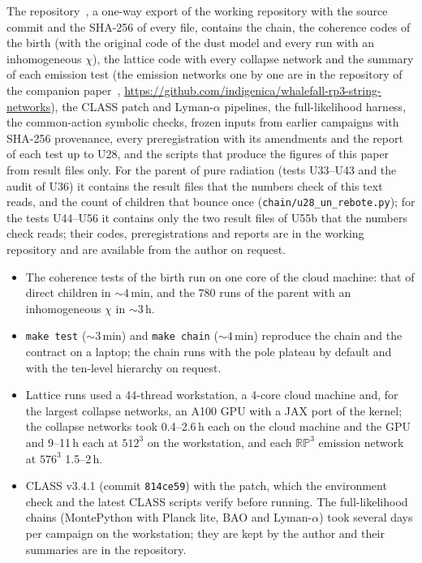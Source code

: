 \documentclass[11pt,a4paper]{article}
\newcommand{\RP}{\mathbb{RP}^3}
\begin{document}
The repository~\cite{whalefall_chain}, a one-way export of the working repository with the source commit and the SHA-256 of every file, contains the chain, the coherence codes of the birth (with the original code of the dust model and every run with an inhomogeneous $\chi$), the lattice code with every collapse network and the summary of each emission test (the emission networks one by one are in the repository of the companion paper~\cite{rp3_paper}, \url{https://github.com/indigenica/whalefall-rp3-string-networks}), the CLASS patch and Lyman-$\alpha$ pipelines, the full-likelihood harness, the common-action symbolic checks, frozen inputs from earlier campaigns with SHA-256 provenance, every preregistration with its amendments and the report of each test up to U28, and the scripts that produce the figures of this paper from result files only.
For the parent of pure radiation (tests U33--U43 and the audit of U36) it contains the result files that the numbers check of this text reads, and the count of children that bounce once (\texttt{chain/u28\_un\_rebote.py}); for the tests U44--U56 it contains only the two result files of U55b that the numbers check reads; their codes, preregistrations and reports are in the working repository and are available from the author on request.
\begin{itemize}
\item The coherence tests of the birth run on one core of the cloud machine: that of direct children in $\sim4$\,min, and the $780$ runs of the parent with an inhomogeneous $\chi$ in $\sim3$\,h.
\item \texttt{make test} ($\sim3$\,min) and \texttt{make chain} ($\sim4$\,min) reproduce the chain and the contract on a laptop; the chain runs with the pole plateau by default and with the ten-level hierarchy on request.
\item Lattice runs used a 44-thread workstation, a 4-core cloud machine and, for the largest collapse networks, an A100 GPU with a JAX port of the kernel; the collapse networks took 0.4--2.6\,h each on the cloud machine and the GPU and 9--11\,h each at $512^3$ on the workstation, and each $\RP$ emission network at $576^3$ 1.5--2\,h.
\item CLASS v3.4.1 (commit \texttt{814ce59}) with the patch, which the environment check and the latest CLASS scripts verify before running. The full-likelihood chains (MontePython with Planck lite, BAO and Lyman-$\alpha$) took several days per campaign on the workstation; they are kept by the author and their summaries are in the repository.
\end{itemize}
\end{document}
